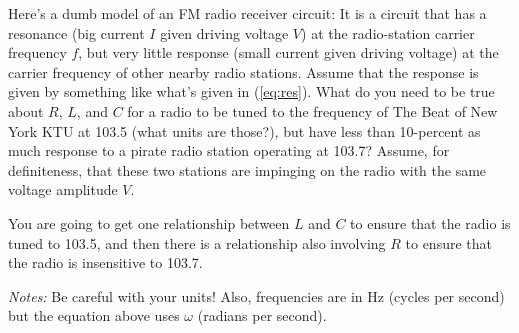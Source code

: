 \documentclass[12pt]{article}
\begin{document}
\startproblem%
Here's a dumb model of an FM radio receiver circuit: It is a circuit that has a
resonance (big current $I$ given driving voltage $V$) at the radio-station
carrier frequency $f$, but very little response (small current given
driving voltage) at the carrier frequency of other nearby radio stations.
Assume that the response is given by something like what's given in (\ref{eq:res}).
What do you need to be true about $R$, $L$,
and $C$ for a radio to be tuned to the frequency of The Beat of New
York KTU at 103.5 (what units are those?),
but have less than 10-percent as much
response to a pirate radio station operating at 103.7? Assume, for
definiteness, that these two stations are impinging on the radio with
the same voltage amplitude $V$.

You are going to get one relationship between $L$ and
$C$ to ensure that the radio is tuned to 103.5, and then there is a
relationship also involving $R$ to ensure that the radio is
insensitive to 103.7.

\textsl{Notes:} Be careful with your units! Also, frequencies are in Hz
(cycles per second) but the equation above uses $\omega$ (radians per second).
\end{document}
